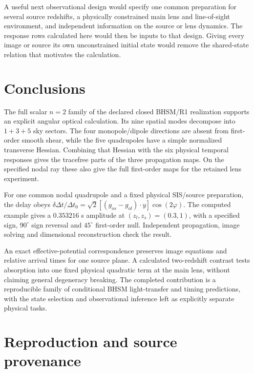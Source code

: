 \documentclass[11pt,a4paper]{article}
\begin{document}
A useful next observational design would specify one common preparation
for several source redshifts, a physically constrained main lens and
line-of-sight environment, and independent information on the source
or lens dynamics. The response rows calculated here would then be inputs
to that design. Giving every image or source its own unconstrained
initial state would remove the shared-state relation that motivates
the calculation.

\section{Conclusions}

The full scalar $n=2$ family of the declared closed BHSM/R1 realization
supports an explicit angular optical calculation. Its nine spatial
modes decompose into $1+3+5$ sky sectors. The four monopole/dipole
directions are absent from first-order smooth shear, while the five
quadrupoles have a simple normalized transverse Hessian. Combining
that Hessian with the six physical temporal responses gives the tracefree
parts of the three propagation maps. On the specified nodal ray these
also give the full first-order maps for the retained lens experiment.

For one common nodal quadrupole and a fixed physical SIS/source
preparation, the delay obeys
$\delta\Delta t/\Delta t_0=
\sqrt2[(g_{os}-g_{ol})\cdot y]\cos(2\varphi)$.
The computed example gives a $0.353216$ s amplitude at
$(z_l,z_s)=(0.3,1)$, with a specified sign, $90^\circ$ sign reversal
and $45^\circ$ first-order null. Independent propagation, image solving
and dimensional reconstruction check the result.

An exact effective-potential correspondence preserves image equations
and relative arrival times for one source plane. A calculated
two-redshift contrast tests absorption into one fixed physical quadratic
term at the main lens, without claiming general degeneracy breaking.
The completed contribution is a reproducible family of conditional
BHSM light-transfer and timing predictions, with the state selection
and observational inference left as explicitly separate physical tasks.

\appendix


\section{Reproduction and source provenance}
\label{app:reproduction}
\end{document}
